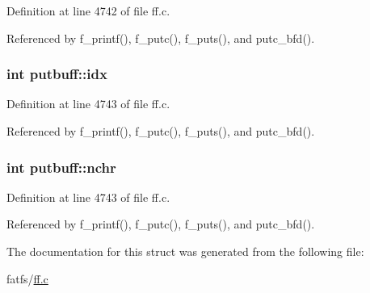 Definition at line 4742 of file ff.\-c.



Referenced by f\-\_\-printf(), f\-\_\-putc(), f\-\_\-puts(), and putc\-\_\-bfd().

\hypertarget{structputbuff_a10a3ca93af8df07e9836ebd5230c06d8}{
\subsubsection[{idx}]{\setlength{\rightskip}{0pt plus 5cm}int putbuff\-::idx}}\label{structputbuff_a10a3ca93af8df07e9836ebd5230c06d8}


Definition at line 4743 of file ff.\-c.



Referenced by f\-\_\-printf(), f\-\_\-putc(), f\-\_\-puts(), and putc\-\_\-bfd().

\hypertarget{structputbuff_a125366bfe48077e6f562f95e30b4604a}{
\subsubsection[{nchr}]{\setlength{\rightskip}{0pt plus 5cm}int putbuff\-::nchr}}\label{structputbuff_a125366bfe48077e6f562f95e30b4604a}


Definition at line 4743 of file ff.\-c.



Referenced by f\-\_\-printf(), f\-\_\-putc(), f\-\_\-puts(), and putc\-\_\-bfd().



The documentation for this struct was generated from the following file\-:\begin{DoxyCompactItemize}
\item 
fatfs/\hyperlink{ff_8c}{ff.\-c}\end{DoxyCompactItemize}
